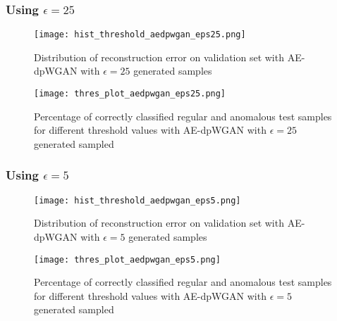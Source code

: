 \subsubsection*{Using $\epsilon=25$}

\begin{figure}[H]
    \begin{minipage}[b]{\textwidth}
        \centering
        \texttt{[image: hist\_threshold\_aedpwgan\_eps25.png]}
        \caption{Distribution of reconstruction error on validation set with AE-dpWGAN with $\epsilon=25$ generated samples}
    
    \end{minipage}
    \begin{minipage}[b]{\textwidth}
        \centering
        \texttt{[image: thres\_plot\_aedpwgan\_eps25.png]}
        \caption{Percentage of correctly classified regular and anomalous test samples for different threshold values with AE-dpWGAN with $\epsilon=25$ generated sampled}
        \label{fig:thres_aegwan}
    \end{minipage}
\end{figure}

\subsubsection*{Using $\epsilon=5$}


\begin{figure}[H]
        \centering
        \texttt{[image: hist\_threshold\_aedpwgan\_eps5.png]}
        \caption{Distribution of reconstruction error on validation set with AE-dpWGAN with $\epsilon=5$ generated samples}
\end{figure}

\begin{figure}[H]
        \centering
        \texttt{[image: thres\_plot\_aedpwgan\_eps5.png]}
        \caption{Percentage of correctly classified regular and anomalous test samples for different threshold values with AE-dpWGAN with $\epsilon=5$ generated sampled}
        \label{fig:thres_aegwan}
\end{figure}